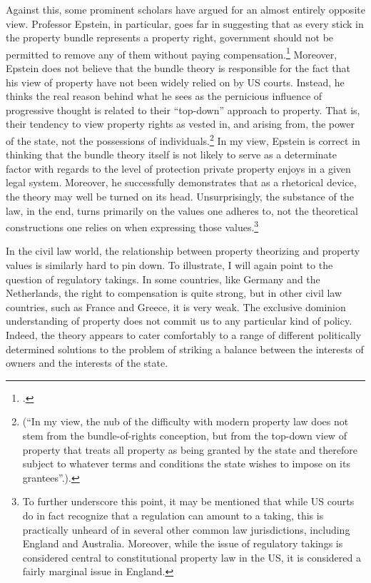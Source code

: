 Against this, some prominent scholars have argued for an almost entirely opposite view. Professor Epstein, in particular, goes far in suggesting that as every stick in the property bundle represents a property right, government should not be permitted to remove any of them without paying compensation.\footcite[232-233]{epstein11} Moreover, Epstein does not believe that the bundle theory is responsible for the fact that his view of property have not been widely relied on by US courts. Instead, he thinks the real reason behind what he sees as the pernicious influence of progressive thought is related to their ``top-down'' approach to property. That is, their tendency to view property rights as vested in, and arising from, the power of the state, not the possessions of individuals.\footnote{\cite[227-228]{epstein11} (``In my view, the nub of the difficulty with modern property law does not stem from the bundle-of-rights conception, but from the top-down view of property that treats all property as being granted by the state and therefore subject to whatever terms and conditions the state wishes to impose on its grantees''.).} In my view, Epstein is correct in thinking that the bundle theory itself is not likely to serve as a determinate factor with regards to the level of protection private property enjoys in a given legal system. Moreover, he successfully demonstrates that as a rhetorical device, the theory may well be turned on its head. Unsurprisingly, the substance of the law, in the end, turns primarily on the values one adheres to, not the theoretical constructions one relies on when expressing those values.\footnote{To further underscore this point, it may be mentioned that while US courts do in fact recognize that a regulation can amount to a taking, this is practically unheard of in several other common law jurisdictions, including England and Australia. Moreover, while the issue of regulatory takings is considered central to constitutional property law in the US, it is considered a fairly marginal issue in England.\cite{altermann12}}

In the civil law world, the relationship between property theorizing and property values is similarly hard to pin down. To illustrate, I will again point to the question of regulatory takings. In some countries, like Germany and the Netherlands, the right to compensation is quite strong, but in other civil law countries, such as France and Greece, it is very weak. The exclusive dominion understanding of property does not commit us to any particular kind of policy. Indeed, the theory appears to cater comfortably to a range of different politically determined solutions to the problem of striking a balance between the interests of owners and the interests of the state. 

